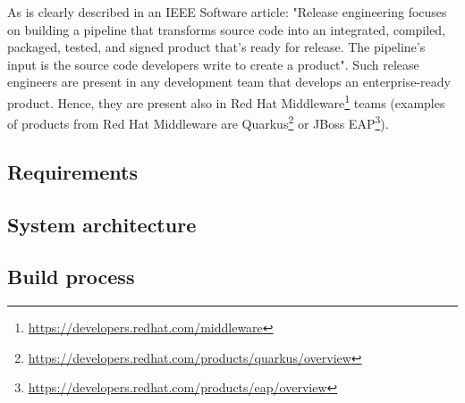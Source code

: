 \documentclass[../main.tex]{subfiles}
\begin{document}
As is clearly described in an IEEE Software article: "Release engineering focuses
on building a pipeline that transforms
source code into an integrated, compiled, packaged, tested, and signed
product that’s ready for release. The
pipeline’s input is the source code developers write to create a product"\cite{releaseEngineeringArticle}. Such release engineers are present in any development team that develops an enterprise-ready product. Hence, they are present also in Red Hat Middleware\footnote{\url{https://developers.redhat.com/middleware}} teams (examples of products from Red Hat Middleware are Quarkus\footnote{\url{https://developers.redhat.com/products/quarkus/overview}} or JBoss EAP\footnote{\url{https://developers.redhat.com/products/eap/overview}}).

\subsection*{Requirements}
\label{subsubsec:pnc-requirements}


\subsection*{System architecture}


\subsection*{Build process}
\label{subsection:build-process}

\end{document}
